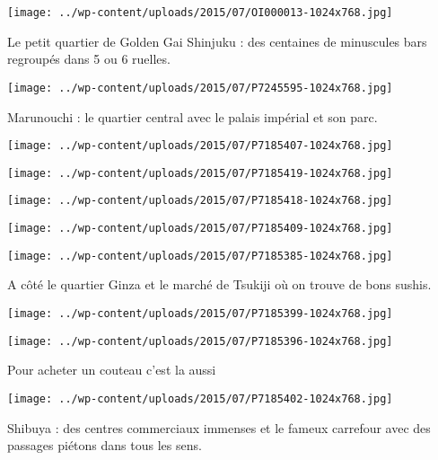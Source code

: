  \newline
\centerline{\texttt{[image: ../wp-content/uploads/2015/07/OI000013-1024x768.jpg]} } 
 \newline
 Le petit quartier de Golden Gai Shinjuku : des centaines de minuscules bars regroupés dans 5 ou 6 ruelles. \newline
 \newline
\centerline{\texttt{[image: ../wp-content/uploads/2015/07/P7245595-1024x768.jpg]} } 
 \newline
 Marunouchi : le quartier central avec le palais impérial et son parc. \newline
 \newline
\centerline{\texttt{[image: ../wp-content/uploads/2015/07/P7185407-1024x768.jpg]} } 
 \newline
 \newline
\centerline{\texttt{[image: ../wp-content/uploads/2015/07/P7185419-1024x768.jpg]} } 
 \newline
 \newline
\centerline{\texttt{[image: ../wp-content/uploads/2015/07/P7185418-1024x768.jpg]} } 
 \newline
 \newline
\centerline{\texttt{[image: ../wp-content/uploads/2015/07/P7185409-1024x768.jpg]} } 
 \newline
 \newline
\centerline{\texttt{[image: ../wp-content/uploads/2015/07/P7185385-1024x768.jpg]} } 
 \newline
 A côté le quartier Ginza et le marché de Tsukiji où on trouve de bons sushis. \newline
 \newline
\centerline{\texttt{[image: ../wp-content/uploads/2015/07/P7185399-1024x768.jpg]} } 
 \newline
 \newline
\centerline{\texttt{[image: ../wp-content/uploads/2015/07/P7185396-1024x768.jpg]} } 
 \newline
 Pour acheter un couteau c'est la aussi \newline
 \newline
\centerline{\texttt{[image: ../wp-content/uploads/2015/07/P7185402-1024x768.jpg]} } 
 \newline
 Shibuya : des centres commerciaux immenses et le fameux carrefour avec des passages piétons dans tous les sens. \newline
